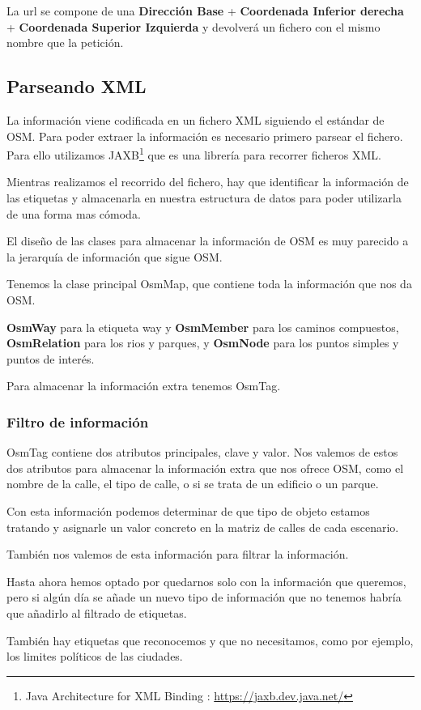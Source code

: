 La url se compone de una {\bf Dirección Base} + {\bf Coordenada Inferior
 derecha} + {\bf Coordenada Superior Izquierda} y devolverá un fichero con el
mismo nombre que la petición.
\subsection*{Parseando XML}
La información viene codificada en un fichero XML siguiendo el estándar de OSM.
Para poder extraer la información es necesario primero parsear el fichero.
Para ello utilizamos JAXB\footnote{Java Architecture for XML Binding :
\url{https://jaxb.dev.java.net/}} que es una librería para recorrer ficheros
XML. 

Mientras realizamos el recorrido del fichero, hay que identificar la
información de las etiquetas y almacenarla en nuestra estructura de datos para
poder utilizarla de una forma mas cómoda.

El diseño de las clases para almacenar la información de OSM es muy parecido a
la jerarquía de información que sigue OSM.

Tenemos la clase principal OsmMap, que contiene toda la información que nos da
OSM.

{\bf OsmWay} para la etiqueta way y {\bf OsmMember} para los caminos
compuestos, {\bf OsmRelation} para los rios y parques, y {\bf OsmNode} para los
puntos simples y puntos de interés. 

Para almacenar la información extra tenemos OsmTag.
\subsubsection*{Filtro de información}
OsmTag contiene dos atributos principales, clave y valor. Nos valemos de estos
dos atributos para almacenar la información extra que nos ofrece OSM, como el
nombre de la calle, el tipo de calle, o si se trata de un edificio o un parque.

Con esta información podemos determinar de que tipo de objeto estamos tratando
y asignarle un valor concreto en la matriz de calles de cada escenario.

También nos valemos de esta información para filtrar la información.

Hasta ahora hemos optado por quedarnos solo con la información que queremos,
pero si algún día se añade un nuevo tipo de información que no tenemos habría
que añadirlo al filtrado de etiquetas.

También hay etiquetas que reconocemos y que no necesitamos, como por ejemplo,
los limites políticos de las ciudades.

